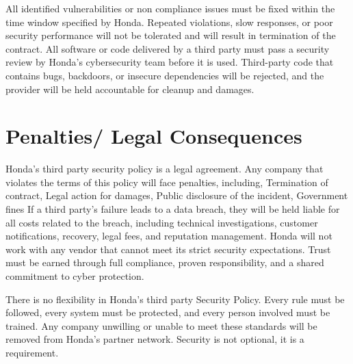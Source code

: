 All identified vulnerabilities or non compliance issues must be fixed within the time window specified by Honda. Repeated violations, slow responses, or poor security performance will not be tolerated and will result in termination of the contract. All software or code delivered by a third party must pass a security review by Honda’s cybersecurity team before it is used. Third-party code that contains bugs, backdoors, or insecure dependencies will be rejected, and the provider will be held accountable for cleanup and damages.

\section{Penalties/ Legal Consequences}
Honda’s third party security policy is a legal agreement. Any company that violates the terms of this policy will face penalties, including, Termination of contract, Legal action for damages, Public disclosure of the incident, Government fines
If a third party’s failure leads to a data breach, they will be held liable for all costs related to the breach, including technical investigations, customer notifications, recovery, legal fees, and reputation management.
Honda will not work with any vendor that cannot meet its strict security expectations. Trust must be earned through full compliance, proven responsibility, and a shared commitment to cyber protection.

There is no flexibility in Honda’s third party Security Policy. Every rule must be followed, every system must be protected, and every person involved must be trained. Any company unwilling or unable to meet these standards will be removed from Honda’s partner network. Security is not optional, it is a requirement.
